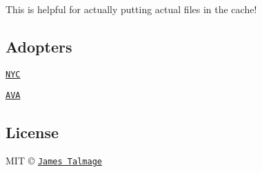 This is helpful for actually putting actual files in the cache!

\subsection*{Adopters}


\begin{DoxyItemize}
\item \href{https://www.npmjs.com/package/nyc}{\tt {\ttfamily N\+YC}}
\item \href{https://www.npmjs.com/package/ava}{\tt {\ttfamily A\+VA}}
\end{DoxyItemize}

\subsection*{License}

M\+IT © \href{http://github.com/jamestalmage}{\tt James Talmage} 